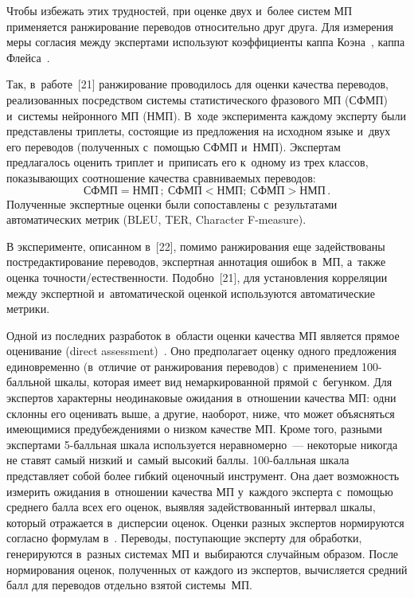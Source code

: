 \begin{multicols}{2}
  Чтобы избежать этих трудностей, при оценке двух и~более систем МП 
применяется ранжирование переводов относительно друг друга. Для 
измерения меры согласия между экспертами используют коэффициенты 
каппа Коэна~\cite[с.~48]{10-nur}, каппа Флейса~\cite{20-nur}.
  
  Так, в~работе~[21] ранжирование проводилось для оценки качества 
переводов, реализованных посредством системы статистического фразового 
МП (СФМП) и~системы нейронного МП
(НМП). В~ходе эксперимента каждому эксперту были представлены 
триплеты, состоящие из предложения на исходном языке и~двух его 
переводов (полученных с~помощью СФМП и~НМП). Экспертам предлагалось 
оценить триплет и~приписать его к~одному из трех классов, показывающих 
соотношение качества сравниваемых переводов: 
$$
\mathrm{СФМП} = 
\mathrm{НМП}\,;\  \mathrm{СФМП} <  \mathrm{НМП};\  \mathrm{СФМП}> 
\mathrm{НМП}\,.
$$
 Полученные экспертные оценки были сопоставлены 
с~результатами автоматических метрик (BLEU, TER, Character F-measure).
  
  В эксперименте, описанном в~[22], помимо ранжирования еще 
задействованы постредактирование переводов, экспертная аннотация ошибок 
в~МП, а~также оценка точности/естественности. Подобно~[21], для 
установления корреляции между экспертной и~автоматической оценкой 
используются автоматические метрики.
  
  Одной из последних разработок в~области оценки качества МП является 
прямое оценивание (direct assessment)~\cite[с.~49--50]{10-nur}. Оно 
предполагает оценку одного предложения единовременно (в~отличие от 
ранжирования переводов) с~применением 100-балль\-ной шкалы, которая 
имеет вид немаркированной прямой с~бегунком. Для экспертов характерны 
неодинаковые ожидания в~отношении качества МП: одни склонны его 
оценивать выше, а другие, наоборот, ниже, что может объясняться 
имеющимися предубеждениями о низком качестве МП. Кроме того, разными 
экспертами 5-балль\-ная шкала используется неравномерно~--- некоторые 
никогда не ставят самый низкий и~самый высокий баллы. 100-балль\-ная 
шкала представляет собой более гибкий оценочный инструмент. Она дает 
возможность измерить ожидания в~отношении качества МП у~каждого 
эксперта с~помощью среднего балла всех его оценок, выявляя 
задействованный интервал шкалы, который отражается в~дисперсии оценок. 
Оценки разных экспертов нормируются согласно формулам в~\cite[с.~49--50]{10-nur}. 
Переводы, поступающие эксперту для обработки, генерируются в~разных 
системах МП и~выбираются случайным образом. После нормирования 
оценок, полученных от каждого из экспертов, вычисляется средний балл для 
переводов отдельно взятой системы~МП.


\end{multicols}
